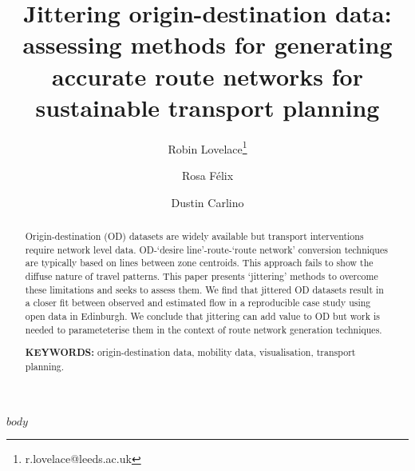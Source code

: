 \documentclass[11pt]{article}
\title{Jittering origin-destination data: assessing methods for generating accurate route networks for sustainable transport planning}
\author[1]{Robin Lovelace\thanks{r.lovelace@leeds.ac.uk}}
\author[2]{Rosa Félix}
\author[3]{Dustin Carlino}
\affil[1]{University of Leeds}
\affil[2]{University of Lisbon}
\affil[3]{Alan Turing Institute, London}
\begin{document}
\maketitle


\begin{abstract}
\centering


Origin-destination (OD) datasets are widely available but transport interventions require network level data.
OD-`desire line'-route-`route network' conversion techniques are typically based on lines between zone centroids.
This approach fails to show the diffuse nature of travel patterns.
This paper presents `jittering' methods to overcome these limitations and seeks to assess them.
We find that jittered OD datasets result in a closer fit between observed and estimated flow in a reproducible case study using open data in Edinburgh.
We conclude that jittering can add value to OD but work is needed to parameteterise them in the context of route network generation techniques.

{\bf KEYWORDS:} origin-destination data, mobility data, visualisation, transport planning.

\end{abstract}


$body$
\end{document}
